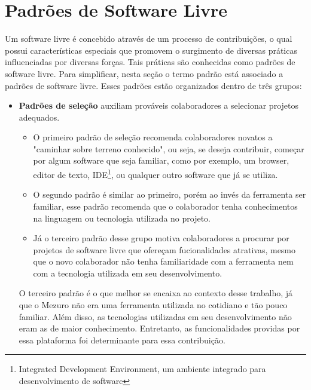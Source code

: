 \section{Padrões de Software Livre}
\label{sec-padroes-sl} 

Um software livre é concebido através de um processo de contribuições, o qual possui características especiais que promovem o surgimento de diversas práticas influenciadas por diversas forças. Tais práticas são conhecidas como padrões de software livre. Para simplificar, nesta seção o termo padrão está associado a padrões de software livre. Esses padrões estão organizados dentro de três grupos:

\begin{itemize}

	\item \textbf{Padrões de seleção} auxiliam prováveis colaboradores a selecionar projetos adequados.

		\begin{itemize}

			\item O primeiro padrão de seleção recomenda colaboradores novatos a "caminhar sobre terreno conhecido", ou seja, se deseja contribuir, começar por algum software que seja familiar, como por exemplo, um browser, editor de texto, IDE\footnote{Integrated Development Environment, um ambiente integrado para desenvolvimento de software}, ou qualquer outro software que já se utiliza.

			\item O segundo padrão é similar ao primeiro, porém ao invés da ferramenta ser familiar, esse padrão recomenda que o colaborador tenha conhecimentos na linguagem ou tecnologia utilizada no projeto.

			\item Já o terceiro padrão desse grupo motiva colaboradores a procurar por projetos de software livre que ofereçam fucionalidades atrativas, mesmo que o novo colaborador não tenha familiaridade com a ferramenta nem com a tecnologia utilizada em seu desenvolvimento.
		\end{itemize}

O terceiro padrão é o que melhor se encaixa ao contexto desse trabalho, já que o Mezuro não era uma ferramenta utilizada no cotidiano e tão pouco familiar. Além disso, as tecnologias utilizadas em seu desenvolvimento não eram as de maior conhecimento. Entretanto, as funcionalidades providas por essa plataforma foi determinante para essa contribuição.


\end{itemize}
